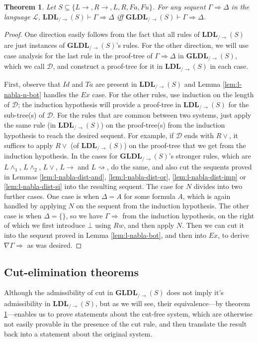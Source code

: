 \documentclass[12pt,a4paper]{article}
\theoremstyle{plain}
\newtheorem{thm}{Theorem}[section]
\theoremstyle{definition}
\begin{document}
\begin{thm}\label{thm:ldl-eq-ldls}
	Let $S \subseteq \{L\rightarrow, R\rightarrow, L, R, Fa, Fu\}$. For any sequent $\Gamma \Rightarrow \Delta$ in the language $\mathcal{L}$, $\mathbf{LDL}_{/\rightarrow}(S) \vdash \Gamma \Rightarrow \Delta$ iff $\mathbf{GLDL}_{/\rightarrow}(S) \vdash \Gamma \Rightarrow \Delta$.
\end{thm}
\begin{proof}
	One direction easily follows from the fact that all rules of $\mathbf{LDL}_{/\rightarrow}(S)$ are just instances of $\mathbf{GLDL}_{/\rightarrow}(S)$'s rules.
	For the other direction, we will use case analysis for the last rule in the proof-tree of $\Gamma \Rightarrow \Delta$ in $\mathbf{GLDL}_{/\rightarrow}(S)$, which we call $\mathcal{D}$, and construct a proof-tree for it in $\mathbf{LDL}_{/\rightarrow}(S)$ in each case.
	
	First, observe that $Id$ and $Ta$ are present in $\mathbf{LDL}_{/\rightarrow}(S)$ and Lemma \ref{lem:l-nabla-n-bot} handles the $Ex$ case.
	For the other rules, use induction on the length of $\mathcal{D}$; the induction hypothesis will provide a proof-tree in $\mathbf{LDL}_{/\rightarrow}(S)$ for the sub-tree(s) of $\mathcal{D}$.
	For the rules that are common between two systems, just apply the same rule (in $\mathbf{LDL}_{/\rightarrow}(S)$) on the proof-tree(s) from the induction hypothesis to reach the desired sequent. For example, if $\mathcal{D}$ ends with $R\vee$, it suffices to apply $R\vee$ (of $\mathbf{LDL}_{/\rightarrow}(S)$) on the proof-tree that we get from the induction hypothesis.
	In the cases for $\mathbf{GLDL}_{/\rightarrow}(S)$'s stronger rules, which are $L\land_1$, $L\land_2$, $L\lor$, $L\rightarrow$ and $L\rightsquigarrow$, do the same, and also cut the sequents proved in Lemmas \ref{lem:l-nabla-dist-and}, \ref{lem:l-nabla-dist-or}, \ref{lem:l-nabla-dist-imp} or \ref{lem:l-nabla-dist-si} into the resulting sequent.
	The case for $N$ divides into two further cases. One case is when $\Delta = A$ for some formula $A$, which is again handled by applying $N$ on the sequent from the induction hypothesis.
	The other case is when $\Delta = \{\}$, so we have $\Gamma \Rightarrow$ from the induction hypothesis, on the right of which we first introduce $\bot$ using $Rw$, and then apply $N$.
	Then we can cut it into the sequent proved in Lemma \ref{lem:l-nabla-bot}, and then into $Ex$, to derive $\nabla \Gamma \Rightarrow$ as was desired.
\end{proof}

\subsection{Cut-elimination theorems}
Although the admissibility of cut in $\mathbf{GLDL}_{/\rightarrow}(S)$ does not imply it's admissibility in $\mathbf{LDL}_{/\rightarrow}(S)$, but as we will see, their equivalence---by theorem \ref{thm:ldl-eq-ldls}---enables us to prove statements about the cut-free system, which are otherwise not easily provable in the presence of the cut rule, and then translate the result back into a statement about the original system.
\end{document}
